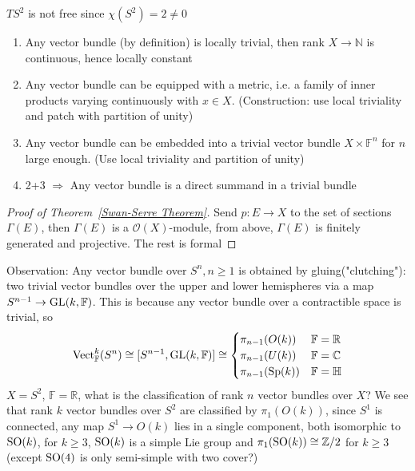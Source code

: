 \documentclass[main]{subfiles}
\begin{document}
\begin{example}
$TS^2$ is not free since $\chi(S^2)=2\neq0$
\end{example}

\begin{fact}\hfill
\begin{enumerate}
\item Any vector bundle (by definition) is locally trivial, then rank $X\to\mathbb N$ is continuous, hence locally constant
\item Any vector bundle can be equipped with a metric, i.e. a family of inner products varying continuously with $x\in X$. (Construction: use local triviality and patch with partition of unity)
\item Any vector bundle can be embedded into a trivial vector bundle $X\times\mathbb F^n$ for $n$ large enough. (Use local triviality and partition of unity)
\item 2+3 $\Rightarrow$ Any vector bundle is a direct summand in a trivial bundle
\end{enumerate}
\end{fact}

\begin{proof}[Proof of Theorem~\ref{Swan-Serre Theorem}]
Send $p:E\to X$ to the set of sections $\Gamma(E)$, then $\Gamma(E)$ is a $\mathcal O(X)$-module, from above, $\Gamma(E)$ is finitely generated and projective. The rest is formal
\end{proof}

\begin{example}
Observation: Any vector bundle over $S^n,n\geq1$ is obtained by gluing("clutching"): two trivial vector bundles over the upper and lower hemispheres via a map $S^{n-1}\to \operatorname{GL}(k,\mathbb F)$. This is because any vector bundle over a contractible space is trivial, so
\[
\operatorname{Vect}_{\mathbb F}^k(S^n)\cong[S^{n-1},\operatorname{GL}(k,\mathbb F)]\cong
\begin{cases}
\pi_{n-1}(O(k))&\mathbb F=\mathbb R\\
\pi_{n-1}(U(k))&\mathbb F=\mathbb C\\
\pi_{n-1}(\operatorname{Sp}(k))&\mathbb F=\mathbb H
\end{cases}
\]
$X=S^2$, $\mathbb F=\mathbb R$, what is the classification of rank $n$ vector bundles over $X$? We see that rank $k$ vector bundles over $S^2$ are classified by $\pi_1(O(k))$, since $S^1$ is connected, any map $S^1\to O(k)$ lies in a single component, both isomorphic to $\operatorname{SO}(k)$, for $k\geq3$, $\operatorname{SO}(k)$ is a simple Lie group and $\pi_1(\operatorname{SO}(k))\cong\mathbb Z/2$ for $k\geq3$(except $\operatorname{SO}(4)$ is only semi-simple with two cover?)
\end{example}
\end{document}
